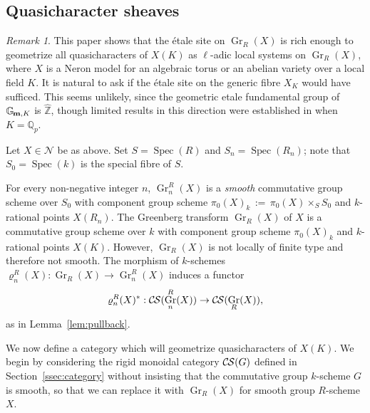 \documentclass[10pt]{amsart}
\theoremstyle{plain}
\theoremstyle{definition}
\theoremstyle{remark}
\newtheorem{remark}[theorem]{Remark}
\newcommand{\ZZ}{{\mathbb{Z}}}
\newcommand{\Fq}{k}
\newcommand{\Gm}[1]{\mathbb{G}_{\hskip-1pt\textbf{m},#1}}
\DeclareMathOperator{\Gr}{Gr}
\newcommand{\Spec}[1]{{\operatorname{Spec}(#1)}}
\newcommand{\ceq}{{\, :=\, }}
\newcommand{\CS}{{\mathcal{C\hskip-0.8pt S}}}
\begin{document}
\subsection{Quasicharacter sheaves}
\label{ssec:CS_on_GN}
 
 \begin{remark}
This paper shows that the \'etale site on $\Gr_R(X)$ is rich enough to geometrize all quasicharacters of $X(K)$ as $\ell$-adic local systems on $\Gr_R(X)$, where $X$ is a Neron model for an algebraic torus or an abelian variety over a local field $K$. 
It is natural to ask if the \'etale site on the generic fibre $X_K$ would have sufficed. 
This seems unlikely, since the geometric etale fundamental group of $\Gm{K}$ is ${\hat \ZZ}$, though limited results in this direction were established in \cite{Cunningham-Kamgarpour} when $K = \mathbb{Q}_p$.
\end{remark}


Let $X \in \mathcal{N}$ be as above.
Set $S = \Spec{R}$ and $S_n = \Spec{R_n}$;
note that $S_0 = \Spec{\Fq}$ is the special fibre of $S$.

For every non-negative integer $n$, $\Gr^R_n(X)$ is a {\it smooth} commutative group scheme over $S_0$
with component group scheme $\pi_0(X)_{\Fq} \ceq \pi_0(X) \times_S S_0$ and $\Fq$-rational points $X(R_n).$
%
The Greenberg transform $\Gr_R(X)$ of $X$ is a commutative group scheme over $\Fq$
with component group scheme $\pi_0(X)_{\Fq}$
and $\Fq$-rational points $X(K).$
However, $\Gr_R(X)$ is not locally of finite type and therefore not smooth.
%
The morphism of $\Fq$-schemes $\varrho^R_n(X) : \Gr_R(X) \to \Gr^R_n(X)$ induces a functor
\[
\varrho^R_n(X)^* : \CS(\Gr^R_n(X)) \to \CS(\Gr_R(X)),
\]
as in Lemma~\ref{lem:pullback}.

We now define a category which will geometrize quasicharacters of $X(K)$.
We begin by considering the rigid monoidal category $\CS(G)$ defined in Section~\ref{ssec:category} without insisting that the commutative group $\Fq$-scheme $G$ is smooth, so that we can replace it with $\Gr_R(X)$ for smooth group $R$-scheme $X$.
\end{document}
